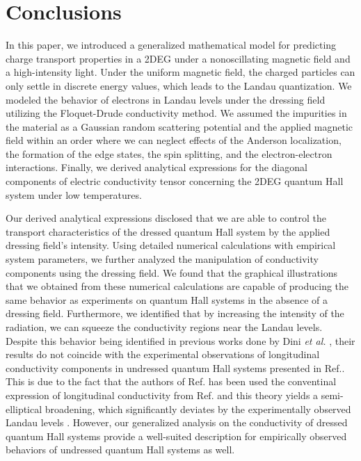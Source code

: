\documentclass[
 reprint,
 amsmath,amssymb,
 aps,
 prb,
]{revtex4-2}
\begin{document}
\section{\label{sec:conclusions} Conclusions}

In this paper, we introduced a generalized mathematical model for predicting  charge transport properties in a 2DEG under a nonoscillating magnetic field and a high-intensity light. Under the uniform magnetic field, the charged particles can only settle in discrete energy values, which leads to the Landau quantization. We modeled the behavior of electrons in Landau levels under the dressing field utilizing the Floquet-Drude conductivity method. {\color{Red}
We assumed the impurities in the material as a Gaussian random scattering potential and the applied magnetic field within an order where we can neglect effects of the Anderson localization, the formation of the edge states, the spin splitting, and the electron-electron interactions. Finally, we derived analytical expressions for the diagonal components of electric conductivity tensor concerning the 2DEG quantum Hall system under low temperatures.}

Our derived analytical expressions disclosed that we are able to control the transport characteristics of the dressed quantum Hall system by the applied dressing field’s intensity. Using detailed numerical calculations with empirical system parameters, we further analyzed the manipulation of conductivity components using the dressing field.
We found that the graphical illustrations that we obtained from these numerical calculations are capable of producing the same behavior as experiments on quantum Hall systems in the absence of a dressing field.
Furthermore, we identified that by increasing the intensity of the radiation, we can squeeze the conductivity regions near the Landau levels. {\color{Red}Despite this behavior being identified in previous works done by Dini \textit{et al.}  \cite{dini16}, their results do not coincide with the experimental observations of longitudinal conductivity components in undressed quantum Hall systems presented in Ref.\cite{endo09}. This is due to the fact that the authors of Ref.\cite{dini16} has been used the conventinal expression of longitudinal conductivity from Ref.\cite{ando74_1,ando82} and this theory yields a semi-elliptical broadening, which significantly deviates by the experimentally observed Landau levels \cite{endo09}.
However, our generalized analysis on the conductivity of dressed quantum Hall systems provide a well-suited description for empirically observed behaviors of undressed quantum Hall systems as well.}
\end{document}
